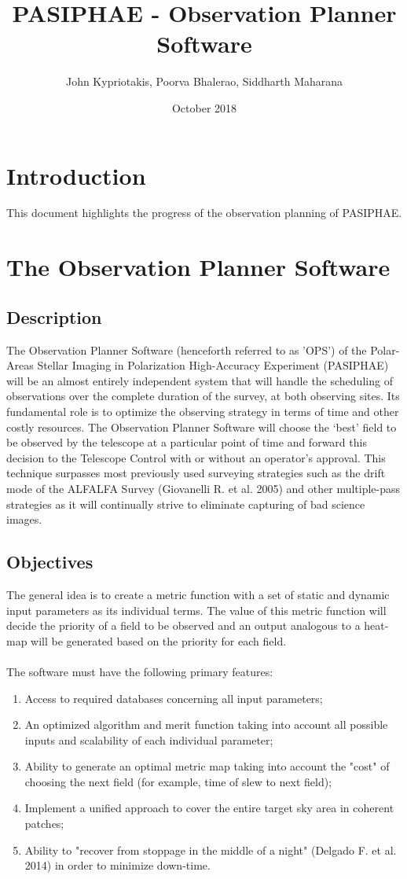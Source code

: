 \documentclass{article}
\title{PASIPHAE - Observation Planner Software}
\author{John Kypriotakis, Poorva Bhalerao, Siddharth Maharana}
\date{October 2018}
\begin{document}
\maketitle

\section{Introduction}
This document highlights the progress of the observation planning of PASIPHAE. 


\section{The Observation Planner Software}
\subsection{Description}
The Observation Planner Software (henceforth referred to as 'OPS') of the Polar-Areas Stellar Imaging in Polarization High-Accuracy Experiment (PASIPHAE) will be an almost entirely independent system that will handle the scheduling of observations over the complete duration of the survey, at both observing sites. Its fundamental role is to optimize the observing strategy in terms of time and other costly resources. The Observation Planner Software will choose the ‘best’ field to be observed by the telescope at a particular point of time and forward this decision to the Telescope Control with or without an operator’s approval. This technique surpasses most previously used surveying strategies such as the drift mode of the ALFALFA Survey (Giovanelli R. et al. 2005) and other multiple-pass strategies as it will continually strive to eliminate capturing of bad science images. 

\subsection{Objectives}
The general idea is to create a metric function with a set of static and dynamic input parameters as its individual terms. The value of this metric function will decide the priority of a field to be observed and an output analogous to a heat-map will be generated based on the priority for each field.
\\
\\
The software must have the following primary features:
\begin{enumerate}
\item Access to required databases concerning all input parameters;
\item An optimized algorithm and merit function taking into account all possible inputs and scalability of each individual parameter;
\item Ability to generate an optimal metric map taking into account the "cost" of choosing the next field (for example, time of slew to next field);
\item Implement a unified approach to cover the entire target sky area in coherent patches; 
\item Ability to "recover from stoppage in the middle of a night" (Delgado F. et al. 2014) in order to minimize down-time.
\end{enumerate}
\end{document}
